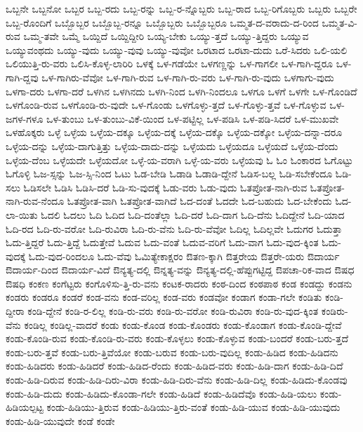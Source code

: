 {ಒಬ್ಬನೇ
ಒಬ್ಬನೋ
ಒಬ್ಬರ
ಒಬ್ಬ-ರದು
ಒಬ್ಬ-ರನ್ನು
ಒಬ್ಬ-ರ-ನ್ನೊಬ್ಬರು
ಒಬ್ಬ-ರಾದ
ಒಬ್ಬ-ರಿಗೊಬ್ಬರು
ಒಬ್ಬರು
ಒಬ್ಬರೇ
ಒಬ್ಬ-ರೊಂದಿಗೆ
ಒಬ್ಬೊಬ್ಬರ
ಒಬ್ಬೊಬ್ಬ-ರನ್ನೂ
ಒಬ್ಬೊಬ್ಬರು
ಒಬ್ಬೊಬ್ಬರೂ
ಒಮ್ಮತ-ದ-ವರಾದು-ದ-ರಿಂದ
ಒಮ್ಮತ-ವಿ-ರುವ
ಒಮ್ಮ-ತವೇ
ಒಮ್ಮೆ
ಒಯ್ದಿದೆ
ಒಯ್ದಿದ್ದೀರಿ
ಒಯ್ಯ-ಬೇಕು
ಒಯ್ಯು-ತ್ತದೆ
ಒಯ್ಯು-ತ್ತಿದ್ದರು
ಒಯ್ಯುವ
ಒಯ್ಯುವಂಥದು
ಒಯ್ಯು-ವುದು
ಒಯ್ಯು-ವುವು
ಒಯ್ಯು-ವುವೋ
ಒರಟಾದ
ಒರಟಾ-ದುದು
ಒರೆ-ಸಿದರು
ಒಲಿ-ಯಲಿ
ಒಲಿಯುತ್ತಿ-ರು-ವರು
ಒಲಿಸಿ-ಕೊಳ್ಳ-ಲಾರಿರಿ
ಒಳಕ್ಕೆ
ಒಳ-ಗಡೆಯೇ
ಒಳಗಣ್ಣನ್ನು
ಒಳ-ಗಾಗಲೀ
ಒಳ-ಗಾಗಿ-ದ್ದರೂ
ಒಳ-ಗಾಗಿ-ದ್ದವು
ಒಳ-ಗಾಗಿರು-ವೆವೋ
ಒಳ-ಗಾಗಿ-ರುವ
ಒಳ-ಗಾಗಿ-ರು-ವರು
ಒಳ-ಗಾಗಿ-ರು-ವುದು
ಒಳಗಾಗು-ವುದು
ಒಳಗಾ-ದರು
ಒಳಗಾ-ದರೆ
ಒಳಗಿನ
ಒಳಗಿನದು
ಒಳಗಿ-ನಿಂದ
ಒಳಗಿ-ನಿಂದಲೂ
ಒಳಗೂ
ಒಳಗೆ
ಒಳಗೇ
ಒಳ-ಗೊಂಡಿದೆ
ಒಳಗೊಂಡಿ-ರುವ
ಒಳಗೊಂಡಿ-ರು-ವುದೇ
ಒಳ-ಗೊಂಡು
ಒಳಗೊಳ್ಳು-ತ್ತದೆ
ಒಳ-ಗೊಳ್ಳು-ತ್ತವೆ
ಒಳ-ಗೊಳ್ಳುವ
ಒಳ-ಜಗಳ-ಗಳೂ
ಒಳ-ತುಂಬು
ಒಳ-ತುಂಬು-ವಿಕೆ-ಯಿಂದ
ಒಳ-ಪಟ್ಟಿಲ್ಲ
ಒಳ-ಪಡಿಸಿ
ಒಳ-ಪಡಿ-ಸಿದರೆ
ಒಳ-ಮುಖವೇ
ಒಳಹೊಕ್ಕರು
ಒಳ್ಳೆ
ಒಳ್ಳೆಯ
ಒಳ್ಳೆಯ-ದಕ್ಕೂ
ಒಳ್ಳೆಯ-ದಕ್ಕೆ
ಒಳ್ಳೆಯ-ದಕ್ಕೊ
ಒಳ್ಳೆಯ-ದಕ್ಕೋ
ಒಳ್ಳೆಯ-ದನ್ನಾ-ದರೂ
ಒಳ್ಳೆಯ-ದನ್ನು
ಒಳ್ಳೆಯ-ದಾಗುತ್ತಿತ್ತು
ಒಳ್ಳೆಯ-ದಾದು-ದನ್ನು
ಒಳ್ಳೆಯದು
ಒಳ್ಳೆಯದೂ
ಒಳ್ಳೆಯದೆ
ಒಳ್ಳೆಯ-ದೆಂದು
ಒಳ್ಳೆಯ-ದೆಂಬ
ಒಳ್ಳೆಯದೇ
ಒಳ್ಳೆಯದೋ
ಒಳ್ಳೆ-ಯ-ವರಾಗಿ
ಒಳ್ಳೆ-ಯ-ವರು
ಒಳ್ಳೆಯವು
ಓ
ಓಂ
ಓಂಕಾರದ
ಓಗೊಟ್ಟು
ಓಗೊಳ್ಳಿ
ಓಜ-ಸ್ಸನ್ನು
ಓಜ-ಸ್ಸಿ-ನಿಂದ
ಓಟು
ಓಡ-ಬೇಡಿ
ಓಡಾಡಿ
ಓಡಾಡಿ-ದ್ದೇನೆ
ಓಡಿಸ-ಬಲ್ಲ
ಓಡಿ-ಸಬೇಕೆಂದೂ
ಓಡಿ-ಸಲು
ಓಡಿಸಲೇ
ಓಡಿಸಿ
ಓಡಿಸಿ-ದರೆ
ಓಡಿ-ಸು-ವುದಕ್ಕೆ
ಓಡು-ವರು
ಓಡು-ವುದು
ಓತಪ್ರೋತ-ನಾಗಿ-ರುವ
ಓತಪ್ರೋತ-ನಾಗಿ-ರುವ-ನೆಂದೂ
ಓತಪ್ರೋತ-ವಾಗಿ
ಓತಪ್ರೋತ-ವಾಗಿದೆ
ಓದ-ದಂತೆ
ಓದದೇ
ಓದ-ಬಹುದು
ಓದ-ಬೇಕೆಂದು
ಓದ-ಲಾ-ಯಿತು
ಓದಲಿ
ಓದಲು
ಓದಿ
ಓದಿದ
ಓದಿ-ದಂತೆಲ್ಲಾ
ಓದಿ-ದರೆ
ಓದಿ-ದಾಗ
ಓದಿ-ದೆನು
ಓದಿದ್ದೇನೆ
ಓದಿ-ಯಾದ
ಓದಿ-ರದ
ಓದಿ-ರು-ವರೋ
ಓದಿ-ರುವಿರಾ
ಓದಿ-ರು-ವೆನು
ಓದಿ-ರು-ವೆವೋ
ಓದಿಲ್ಲ
ಓದಿಲ್ಲವೇ
ಓದುಗರ
ಓದುತ್ತಾ
ಓದು-ತ್ತಿದ್ದರೆ
ಓದು-ತ್ತಿದ್ದೆ
ಓದುತ್ತೇವೆ
ಓದುವ
ಓದು-ವಂತೆ
ಓದುವ-ವರಿಗೆ
ಓದು-ವಾಗ
ಓದು-ವುದ-ಕ್ಕಿಂತ
ಓದು-ವುದಕ್ಕೆ
ಓದು-ವುದ-ರಿಂದಲೂ
ಓದು-ವೆವು
ಓಮಿತ್ಯೇಕಾಕ್ಷರಂ
ಔತಣ-ಕ್ಕಾಗಿ
ಔತ್ತರೇಯ
ಔತ್ತರೇ-ಯರು
ಔದಾರ್ಯ
ಔದಾರ್ಯ-ದಿಂದ
ಔದಾರ್ಯ-ವಿದೆ
ಔನ್ಯತ್ಯ-ದಲ್ಲಿ
ಔನ್ನತ್ಯ-ವನ್ನು
ಔನ್ಯತ್ಯ-ದಲ್ಲಿ-ಹೆಪ್ಪುಗಟ್ಟಿದ್ದ
ಔಪಚಾ-ರಿಕ-ವಾದ
ಔಷಧ
ಔಷಧಿ
ಕಂಕಣ
ಕಂಗೆಟ್ಟರು
ಕಂಗೊಳಿಸು-ತ್ತಿ-ರು-ವನು
ಕಂಟಕ-ರಾದರು
ಕಂಠ-ದಿಂದ
ಕಂಠಪಾಠ
ಕಂಡ
ಕಂಡದ್ದು
ಕಂಡನು
ಕಂಡರು
ಕಂಡರೂ
ಕಂಡರೆ
ಕಂಡ-ವನು
ಕಂಡ-ವರಿಲ್ಲ
ಕಂಡ-ವರು
ಕಂಡವೋ
ಕಂಡಾಗ
ಕಂಡಾ-ಗಲೇ
ಕಂಡಿತು
ಕಂಡಿ-ದ್ದೀರಾ
ಕಂಡಿ-ದ್ದೇನೆ
ಕಂಡಿ-ರ-ಲಿಲ್ಲ
ಕಂಡಿ-ರು-ವರು
ಕಂಡಿ-ರು-ವರೋ
ಕಂಡಿ-ರುವಿರಾ
ಕಂಡಿ-ರು-ವುದ-ಕ್ಕಿಂತ
ಕಂಡಿರು-ವೆನು
ಕಂಡಿಲ್ಲ
ಕಂಡಿಲ್ಲ-ವಾದರೆ
ಕಂಡು
ಕಂಡು-ಕೊಂಡ
ಕಂಡು-ಕೊಂಡರು
ಕಂಡು-ಕೊಂಡಾಗ
ಕಂಡು-ಕೊಂಡಿ-ದ್ದೇವೆ
ಕಂಡು-ಕೊಂಡಿ-ರುವ
ಕಂಡು-ಕೊಂಡಿ-ರು-ವರು
ಕಂಡು-ಕೊಳ್ಳಲು
ಕಂಡು-ಕೊಳ್ಳುವ
ಕಂಡು-ಬಂದರೆ
ಕಂಡು-ಬರು-ತ್ತದೆ
ಕಂಡು-ಬರು-ತ್ತವೆ
ಕಂಡು-ಬರು-ತ್ತಿವೆಯೋ
ಕಂಡು-ಬರುವ
ಕಂಡು-ಬರು-ವುದಿಲ್ಲ
ಕಂಡು-ಹಿಡಿದ
ಕಂಡು-ಹಿಡಿದನು
ಕಂಡು-ಹಿಡಿದರು
ಕಂಡು-ಹಿಡಿದರೆ
ಕಂಡು-ಹಿಡಿದ-ರೆಂದು
ಕಂಡು-ಹಿಡಿದ-ವರು
ಕಂಡು-ಹಿಡಿ-ದಾಗ
ಕಂಡು-ಹಿಡಿ-ದಿದೆ
ಕಂಡು-ಹಿಡಿ-ದಿರುವ
ಕಂಡು-ಹಿಡಿ-ದಿರು-ವಿರಾ
ಕಂಡು-ಹಿಡಿ-ದಿರು-ವೆನು
ಕಂಡು-ಹಿಡಿ-ದಿಲ್ಲ
ಕಂಡು-ಹಿಡಿದು-ಕೊಂಡವು
ಕಂಡು-ಹಿಡಿ-ದುದು
ಕಂಡು-ಹಿಡಿದು-ಕೊಂಡಾ-ಗಲೇ
ಕಂಡು-ಹಿಡಿದೆ
ಕಂಡು-ಹಿಡಿದೆವೊ
ಕಂಡು-ಹಿಡಿ-ಯಲು
ಕಂಡು-ಹಿಡಿಯಲ್ಪಟ್ಟ
ಕಂಡು-ಹಿಡಿಯು-ತ್ತಿರುವ
ಕಂಡು-ಹಿಡಿಯು-ತ್ತಿರು-ವಂತೆ
ಕಂಡು-ಹಿಡಿ-ಯುವ
ಕಂಡು-ಹಿಡಿ-ಯುವುದು
ಕಂಡು-ಹಿಡಿ-ಯುವುದೇ
ಕಂಡೆ
ಕಂಡೇ
}
